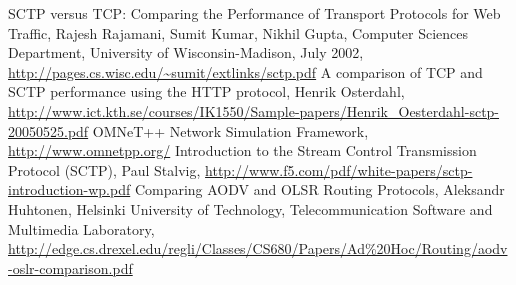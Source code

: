 \documentclass[a4paper]{article}
\begin{document}
\begin{thebibliography}{99}
 SCTP versus TCP: Comparing the Performance of Transport Protocols for Web Traffic, Rajesh Rajamani, Sumit Kumar, Nikhil Gupta, Computer Sciences Department, University of Wisconsin-Madison, July 2002, \url{http://pages.cs.wisc.edu/~sumit/extlinks/sctp.pdf}
 A comparison of TCP and SCTP performance using the HTTP protocol, Henrik Osterdahl, \url{http://www.ict.kth.se/courses/IK1550/Sample-papers/Henrik_Oesterdahl-sctp-20050525.pdf}
 OMNeT++ Network Simulation Framework, \url{http://www.omnetpp.org/}
 Introduction to the Stream Control Transmission Protocol (SCTP), Paul Stalvig, \url{http://www.f5.com/pdf/white-papers/sctp-introduction-wp.pdf}
 Comparing AODV and OLSR Routing Protocols, Aleksandr Huhtonen, Helsinki University of Technology, Telecommunication Software and Multimedia Laboratory, \url{http://edge.cs.drexel.edu/regli/Classes/CS680/Papers/Ad%20Hoc/Routing/aodv-oslr-comparison.pdf}
\end{thebibliography}
\end{document}
